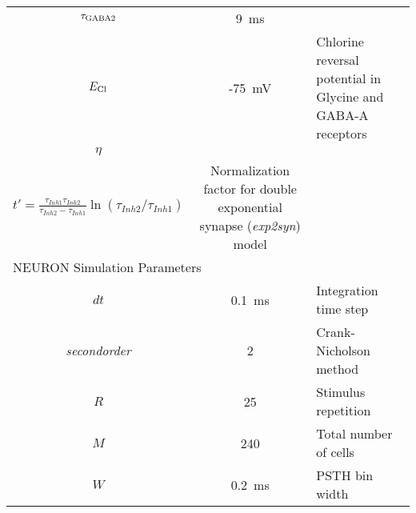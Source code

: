 \begin{table}[tp]
\begin{tabularx}{\textwidth}{ccX}
     $\tau _{{\rm GABA2}}$      &          9~ms           & \\ %
        $E_{{\rm Cl}}$          &         -75~mV          & Chlorine reversal potential in Glycine and GABA-A receptors \\ %
           $\eta $           & \begin{minipage}[c]{2in}\begin{center}
 $\eta = \frac{1}{-\exp(t'/\tau_{Inh1})+\exp(t'/\tau_{inh2})}$ \\
 $t'=\frac{\tau_{Inh1}\tau_{Inh2}}{\tau_{Inh2}-\tau_{Inh1}}
 \ln(\tau_{Inh2}/\tau_{Inh1})$
 \end{center}   \end{minipage}                         & Normalization factor for  double exponential synapse (\textit{exp2syn}) model \cite{HinesCarnevale:2000} \\ \midrule
\multicolumn{2}{l}{NEURON Simulation Parameters} & \\ %
        $dt$         &          0.1~ms           & Integration time step \\ %
\textit{secondorder} &             2             & Crank-Nicholson method \\ %
        $R$          &            25             & Stimulus repetition \\ %
        $M$          &            240            & Total number of cells \\ %
        $W$          &          0.2~ms           & PSTH bin width \\
\bottomrule
\end{tabularx}
\end{table}

